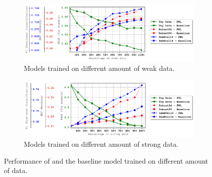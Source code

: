 \begin{figure}[!t]%
    \centering
    \begin{subfigure}[t]{\textwidth}
        \centering
        \includegraphics[width=\textwidth]{03-part-02/chapter-05/figs_and_tables/fig_data_w.png}
        \caption{\label{fig:plot_dw}\footnotesize{Models trained on different amount of weak data.}}
    \end{subfigure}%
    \hfill
    \begin{subfigure}[t]{\textwidth}
        \centering
        \includegraphics[width=\textwidth]{03-part-02/chapter-05/figs_and_tables/fig_data_s.png}
        \caption{\label{fig:plot_dt}\footnotesize{Models trained on different amount of strong data.}}
    \end{subfigure}%
    \caption{Performance of \fwl and the baseline model trained on different amount of data.}
    \label{fig:learning_rate}
\end{figure}